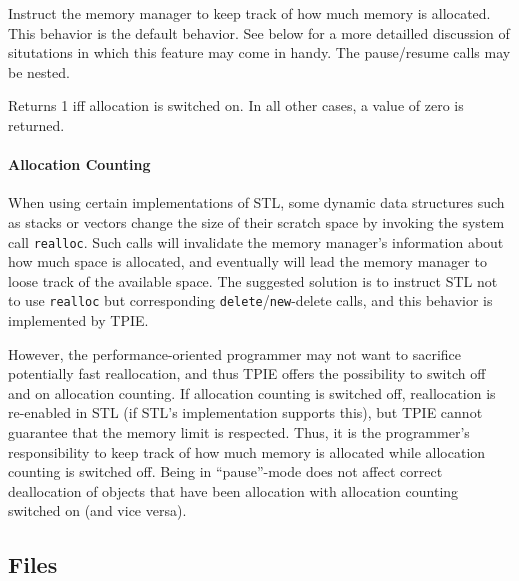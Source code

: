   {Instruct the
    memory manager to keep track of how much memory is allocated. This
    behavior is the default behavior. See below for a more detailled
    discussion of situtations in which this feature may come in
    handy. The pause/resume calls may be nested.}
  
   {
    Returns 1 iff allocation is switched on. In all other cases, a
    value of zero is returned.}

  \etabb

\paragraph{Allocation Counting}  When using certain implementations of
STL, some dynamic data structures such as stacks or vectors change
the size of their scratch space by invoking the system call
\texttt{realloc}. Such calls will invalidate the memory manager's
information about how much space is allocated, and eventually will
lead the memory manager to loose track of the available space. The
suggested solution is to instruct STL not to use \texttt{realloc} but
corresponding \texttt{delete}/\texttt{new}-delete calls, and this
behavior is implemented by TPIE.

However, the performance-oriented programmer may not want to sacrifice
potentially fast reallocation, and thus TPIE offers the possibility to
switch off and on allocation counting. If allocation counting is
switched off, reallocation is re-enabled in STL (if STL's
implementation supports this), but TPIE cannot guarantee that the
memory limit is respected. Thus, it is the programmer's responsibility
to keep track of how much memory is allocated while allocation
counting is switched off. Being in ``pause''-mode does not affect
correct deallocation of objects that have been allocation with
allocation counting switched on (and vice versa).



\clearpage

\subsection{Files}
  \btabb
     {}
  \etabb

